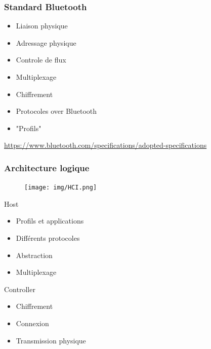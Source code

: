 \begin{frame}
	\frametitle{Standard Bluetooth}
	\vspace{0.5cm}
	\begin{itemize}
		\item Liaison physique
		\item Adressage physique
		\item Controle de flux
		\item Multiplexage
		\item Chiffrement
		\item Protocoles over Bluetooth
		\item "Profils"
	\end{itemize}
	\vspace{0.5cm}
	\tiny{\url{https://www.bluetooth.com/specifications/adopted-specifications}}
\end{frame}


\begin{frame}
	\frametitle{Architecture logique}
	\begin{minipage}{0.45\linewidth}
		\begin{figure}
			\texttt{[image: img/HCI.png]}
		\end{figure}
	\end{minipage}
	\begin{minipage}{0.50\linewidth}
		\begin{block}{Host}
			\begin{itemize}
				\item Profils et applications
				\item Différents protocoles
				\item Abstraction
				\item Multiplexage
			\end{itemize}
		\end{block}
		\begin{block}{Controller}
			\begin{itemize}
				\item Chiffrement
				\item Connexion
				\item Transmission physique
			\end{itemize}
		\end{block}
	\end{minipage}
\end{frame}
